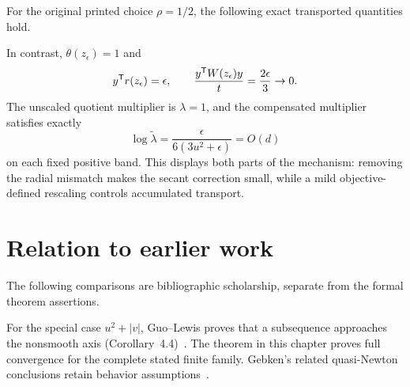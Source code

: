 For the original printed choice $\rho=1/2$, the following exact transported quantities hold.

In contrast, $\theta(z_\epsilon)=1$ and
\[
 y^{\mathsf T} r(z_\epsilon)=\epsilon,\qquad
 \frac{y^{\mathsf T} W(z_\epsilon)y}{t}=\frac{2\epsilon}{3}\to0.
\]
The unscaled quotient multiplier is $\lambda=1$, and the compensated multiplier satisfies exactly
\[
 \log\widetilde\lambda
 =\frac{\epsilon}{6(3u^2+\epsilon)}=O(d)
\]
on each fixed positive band. This displays both parts of the mechanism: removing the radial mismatch makes the secant correction small, while a mild objective-defined rescaling controls accumulated transport.


\endgroup


\section*{Relation to earlier work}
The following comparisons are bibliographic scholarship, separate from the formal theorem assertions.

For the special case $u^2+|v|$, Guo--Lewis proves that a subsequence approaches the nonsmooth axis (Corollary~4.4)~\cite{GL18}. The theorem in this chapter proves full convergence for the complete stated finite family. Gebken's related quasi-Newton conclusions retain behavior assumptions~\cite{BG}.

